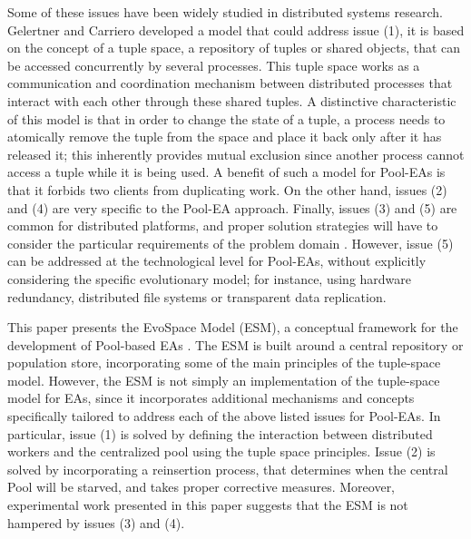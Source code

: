 Some of these issues have been widely studied in distributed systems research.
Gelertner and Carriero \cite{linda} developed a model that could address issue (1), it is based on the concept of a tuple space, a repository of tuples or shared objects, that can be accessed concurrently by several processes. This tuple space works as a communication and coordination mechanism between distributed processes that interact with each other through these shared tuples. A distinctive characteristic of this model is that in order to change the state of a tuple, a process needs to atomically remove the tuple from the space and place it back only after it has released it; this inherently provides mutual exclusion since another process cannot access a tuple while it is being used. A benefit of such a model for Pool-EAs is that it forbids two clients from duplicating work. 
On the other hand, issues (2) and (4) are very specific to the Pool-EA approach.
Finally, issues (3) and (5) are common for distributed platforms, and proper solution strategies will have to consider the particular requirements of the problem domain \cite{new1,new2}.
However, issue (5) can be addressed at the technological level for Pool-EAs, without explicitly considering the specific evolutionary model;
for instance, using hardware redundancy, distributed file systems or transparent data replication.


This paper presents the EvoSpace Model (ESM), a conceptual framework for the development of Pool-based EAs \cite{Evospace}.
The ESM is built around a central repository or population store, incorporating some of the main principles of the tuple-space model.
However, the ESM is not simply an implementation of the tuple-space model for EAs,
since it incorporates additional mechanisms and concepts specifically tailored to address each of the above listed issues for Pool-EAs.
In particular, issue (1) is solved by defining the interaction between distributed workers and the centralized pool using the tuple space principles.
Issue (2) is solved by incorporating a reinsertion process, that determines when the central Pool will be starved, and takes proper corrective measures.
Moreover, experimental work presented in this paper suggests that the ESM is not hampered by issues (3) and (4).



